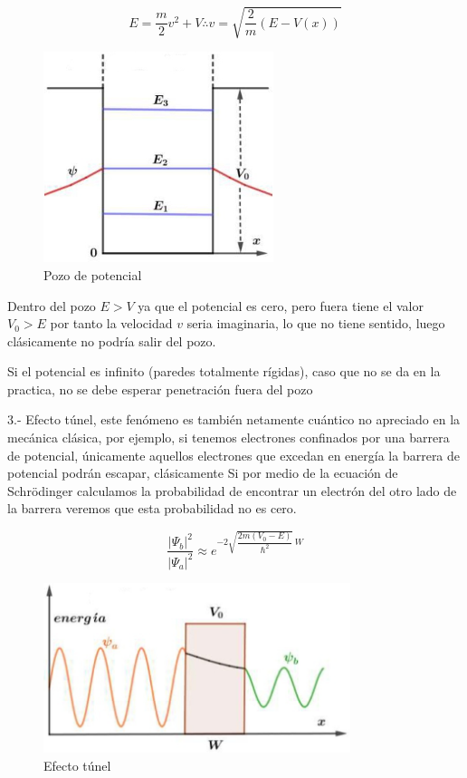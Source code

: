 \begin{equation}
	E=\dfrac{m}{2}v^{2} + V \therefore v= \sqrt{\dfrac{2}{m}\left( E-V(x) \right)} 
\end{equation}

\begin{figure}[H]
    \centering
    \includegraphics[width=0.60\textwidth]{./Figures/fig17}
	\caption{Pozo de potencial}
	\label{fig:17}
 \end{figure}

Dentro
del pozo $E>V$ ya que el potencial es cero, pero fuera tiene el valor $V_{0}>E$ por tanto la velocidad $v$ seria imaginaria, lo que no tiene sentido, luego clásicamente no podría salir del pozo.

Si el potencial es infinito (paredes totalmente rígidas), caso que no se da en la practica, no se debe
esperar penetración fuera del pozo

3.- Efecto túnel, este fenómeno es también netamente cuántico no apreciado en la mecánica clásica, por ejemplo, si tenemos electrones confinados por una barrera de potencial, únicamente aquellos electrones que excedan en energía la barrera de potencial podrán escapar, clásicamente Si por medio de la ecuación de Schrödinger calculamos la probabilidad de encontrar un electrón del otro lado de la barrera veremos que esta probabilidad no es cero.

\begin{equation}
	\dfrac{\vert\Psi_{b}\vert^{2}}{\vert\Psi_{a}\vert^{2}} \approx e^{-2\sqrt{\dfrac{2m(V_{0}-E)}{\hbar^{2}}}\,W} 
\end{equation}

\begin{figure}[H]
    \centering
    \includegraphics[width=0.80\textwidth]{./Figures/fig18}
	\caption{Efecto túnel}
	\label{fig:18}
 \end{figure}

